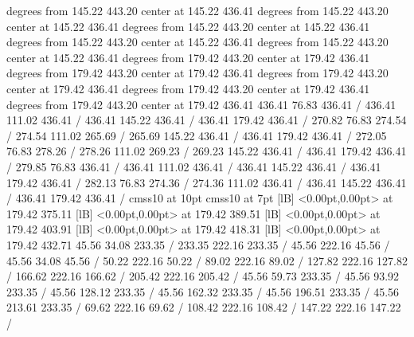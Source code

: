 { degrees from 145.22 443.20 center at 145.22 436.41
 degrees from 145.22 443.20 center at 145.22 436.41
 degrees from 145.22 443.20 center at 145.22 436.41
 degrees from 145.22 443.20 center at 145.22 436.41
 degrees from 145.22 443.20 center at 145.22 436.41
 degrees from 179.42 443.20 center at 179.42 436.41
 degrees from 179.42 443.20 center at 179.42 436.41
 degrees from 179.42 443.20 center at 179.42 436.41
 degrees from 179.42 443.20 center at 179.42 436.41
 degrees from 179.42 443.20 center at 179.42 436.41
\setdashpattern <4pt, 4pt>
 436.41 76.83 436.41 /
 436.41 111.02 436.41 /
 436.41 145.22 436.41 /
 436.41 179.42 436.41 /
\setdashpattern <4pt, 4pt>
 270.82 76.83 274.54 /
 274.54 111.02 265.69 /
 265.69 145.22 436.41 /
 436.41 179.42 436.41 /
\setdashpattern <4pt, 4pt>
 272.05 76.83 278.26 /
 278.26 111.02 269.23 /
 269.23 145.22 436.41 /
 436.41 179.42 436.41 /
\setdashpattern <4pt, 4pt>
 279.85 76.83 436.41 /
 436.41 111.02 436.41 /
 436.41 145.22 436.41 /
 436.41 179.42 436.41 /
\setdashpattern <4pt, 4pt>
 282.13 76.83 274.36 /
 274.36 111.02 436.41 /
 436.41 145.22 436.41 /
 436.41 179.42 436.41 /
\font\picfont cmss10 at 10pt\picfont
\font\picfont cmss10 at 7pt\picfont
{}  [lB] <0.00pt,0.00pt> at 179.42 375.11
  [lB] <0.00pt,0.00pt> at 179.42 389.51
  [lB] <0.00pt,0.00pt> at 179.42 403.91
  [lB] <0.00pt,0.00pt> at 179.42 418.31
  [lB] <0.00pt,0.00pt> at 179.42 432.71
\setsolid
{} 45.56 34.08 233.35 /
 233.35 222.16 233.35 /
 45.56 222.16 45.56 /
 45.56 34.08 45.56 /
\setsolid
{} 50.22 222.16 50.22 /
\setsolid
{} 89.02 222.16 89.02 /
\setsolid
{} 127.82 222.16 127.82 /
\setsolid
{} 166.62 222.16 166.62 /
\setsolid
{} 205.42 222.16 205.42 /
\setsolid
{} 45.56 59.73 233.35 /
\setsolid
{} 45.56 93.92 233.35 /
\setsolid
{} 45.56 128.12 233.35 /
\setsolid
{} 45.56 162.32 233.35 /
\setsolid
{} 45.56 196.51 233.35 /
\setsolid
{} 45.56 213.61 233.35 /
\setsolid
{} 69.62 222.16 69.62 /
\setsolid
{} 108.42 222.16 108.42 /
\setsolid
{} 147.22 222.16 147.22 /
}
